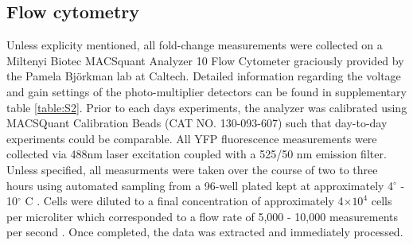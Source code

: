 
\subsection*{Flow cytometry}
Unless explicity mentioned, all fold-change measurements were collected on a
Miltenyi Biotec MACSquant Analyzer 10 Flow Cytometer graciously provided by the
Pamela Bj\"{o}rkman lab at Caltech. Detailed information regarding the voltage
and gain  settings of the photo-multiplier detectors can be found in
supplementary table \ref{table:S2}. Prior to each days experiments, the
analyzer was calibrated using MACSQuant Calibration Beads (CAT NO. 130-093-607)
such that day-to-day experiments could be comparable. All YFP fluorescence
measurements were collected via 488nm laser excitation  coupled with a 525/50
nm emission filter. Unless specified, all measurments were  taken over the
course of two to three hours using automated sampling from a 96-well plated
kept at approximately 4$^\circ$ - 10$^\circ$ C . Cells were diluted to a final concentration of
approximately 4$\times 10^{4}$ cells per microliter which corresponded to a
flow rate of 5,000 - 10,000 measurements per second . Once completed, the data
was extracted and immediately  processed.

